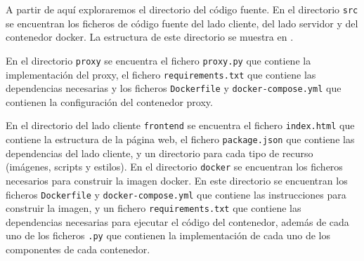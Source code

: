 A partir de aquí exploraremos el directorio del código fuente. En el directorio \texttt{src} se encuentran los ficheros de código fuente del lado cliente, del lado servidor y del contenedor docker. La estructura de este directorio se muestra en .

\begin{figure}[htb]
    {
    \begin{tcolorbox}
    \end{tcolorbox}
    }
\end{figure}
En el directorio \texttt{proxy} se encuentra el fichero \texttt{proxy.py} que contiene la implementación del proxy, el fichero \texttt{requirements.txt} que contiene las dependencias necesarias y los ficheros \texttt{Dockerfile} y \texttt{docker-compose.yml} que contienen la configuración del contenedor proxy.

En el directorio del lado cliente \texttt{frontend} se encuentra el fichero \texttt{index.html} que contiene la estructura de la página web, el fichero \texttt{package.json} que contiene las dependencias del lado cliente, y un directorio para cada tipo de recurso (imágenes, scripts y estilos). 
En el directorio \texttt{docker} se encuentran los ficheros necesarios para construir la imagen docker. En este directorio se encuentran los ficheros \texttt{Dockerfile} y \texttt{docker-compose.yml} que contiene las instrucciones para construir la imagen, y un fichero \texttt{requirements.txt} que contiene las dependencias necesarias para ejecutar el código del contenedor, además de cada uno de los ficheros \texttt{.py} que contienen la implementación de cada uno de los componentes de cada contenedor.  


